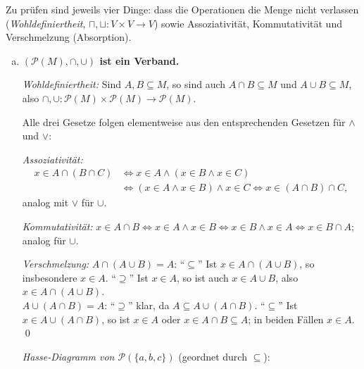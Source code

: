 \begin{loesung}
Zu prüfen sind jeweils vier Dinge: dass die Operationen die Menge nicht verlassen (\emph{Wohldefiniertheit}, $\sqcap,\sqcup:V\times V\to V$) sowie Assoziativität, Kommutativität und Verschmelzung (Absorption).

\begin{enumerate}[a)]
  \item \textbf{$(\mathcal{P}(M),\cap,\cup)$ ist ein Verband.}

  \emph{Wohldefiniertheit:} Sind $A,B\subseteq M$, so sind auch $A\cap B\subseteq M$ und $A\cup B\subseteq M$, also $\cap,\cup:\mathcal{P}(M)\times\mathcal{P}(M)\to\mathcal{P}(M)$.

  Alle drei Gesetze folgen elementweise aus den entsprechenden Gesetzen für $\wedge$ und $\vee$:

  \emph{Assoziativität:}
  \begin{align*}
    x\in A\cap(B\cap C) &\Leftrightarrow x\in A\wedge(x\in B\wedge x\in C)\\
      &\Leftrightarrow (x\in A\wedge x\in B)\wedge x\in C \Leftrightarrow x\in (A\cap B)\cap C,
  \end{align*}
  analog mit $\vee$ für $\cup$.

  \emph{Kommutativität:} $x\in A\cap B\Leftrightarrow x\in A\wedge x\in B\Leftrightarrow x\in B\wedge x\in A\Leftrightarrow x\in B\cap A$; analog für $\cup$.

  \emph{Verschmelzung:} $A\cap(A\cup B)=A$:
  \enquote{$\subseteq$} Ist $x\in A\cap(A\cup B)$, so insbesondere $x\in A$.
  \enquote{$\supseteq$} Ist $x\in A$, so ist auch $x\in A\cup B$, also $x\in A\cap(A\cup B)$.\\
  $A\cup(A\cap B)=A$:
  \enquote{$\supseteq$} klar, da $A\subseteq A\cup(A\cap B)$.
  \enquote{$\subseteq$} Ist $x\in A\cup(A\cap B)$, so ist $x\in A$ oder $x\in A\cap B\subseteq A$; in beiden Fällen $x\in A$. \qed

  \emph{Hasse-Diagramm von $\mathcal{P}(\{a,b,c\})$} (geordnet durch $\subseteq$):
  \begin{center}
  \end{center}


\end{enumerate}
\end{loesung}
